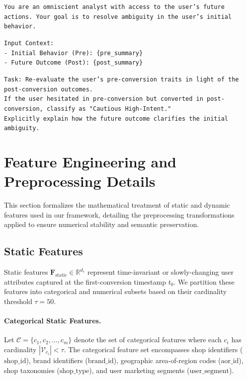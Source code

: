 \begin{tcolorbox}[colback=gray!10, colframe=gray!50, title=System Prompt: Hindsight Reasoning Fusion]
\small
\texttt{You are an omniscient analyst with access to the user's future actions. Your goal is to resolve ambiguity in the user's initial behavior.}

\texttt{Input Context:} \\
\texttt{- Initial Behavior (Pre): \{pre\_summary\}} \\
\texttt{- Future Outcome (Post): \{post\_summary\}}

\texttt{Task: Re-evaluate the user's pre-conversion traits in light of the post-conversion outcomes.} \\
\texttt{If the user hesitated in pre-conversion but converted in post-conversion, classify as "Cautious High-Intent."} \\
\texttt{Explicitly explain how the future outcome clarifies the initial ambiguity.}
\end{tcolorbox}

\section{Feature Engineering and Preprocessing Details}
\label{app:features}

This section formalizes the mathematical treatment of static and dynamic features used in our framework, detailing the preprocessing transformations applied to ensure numerical stability and semantic preservation.

\subsection{Static Features}
\label{app:static_features}

Static features $\mathbf{F}_{\text{static}} \in \mathbb{R}^{d_s}$ represent time-invariant or slowly-changing user attributes captured at the first-conversion timestamp $t_0$. We partition these features into categorical and numerical subsets based on their cardinality threshold $\tau = 50$.

\paragraph{Categorical Static Features.}
Let $\mathcal{C} = \{c_1, c_2, \ldots, c_m\}$ denote the set of categorical features where each $c_i$ has cardinality $|\mathcal{V}_{c_i}| < \tau$. The categorical feature set encompasses shop identifiers ($\text{shop\_id}$), brand identifiers ($\text{brand\_id}$), geographic area-of-region codes ($\text{aor\_id}$), shop taxonomies ($\text{shop\_type}$), and user marketing segments ($\text{user\_segment}$).

